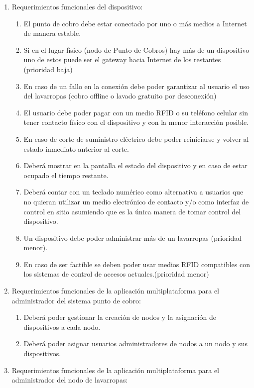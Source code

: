\documentclass[11pt]{charter}
\begin{document}
\begin{enumerate}
\item Requerimientos funcionales del dispositivo:
	\begin{enumerate}
\item El punto de cobro debe estar conectado por uno o más medios a  Internet de manera estable.
\item Si en el lugar físico (nodo de Punto de Cobros) hay más de un dispositivo uno de estos puede ser el gateway hacia Internet de los restantes (prioridad baja) 
\item En caso de un fallo en la conexión debe poder garantizar al usuario el uso del lavarropas (cobro offline o lavado gratuito por desconexión)
\item El usuario debe poder pagar con un medio RFID o su teléfono celular sin tener contacto físico con el dispositivo y con la menor interacción posible.
\item En caso de corte de suministro eléctrico debe poder reiniciarse y volver al estado inmediato anterior al corte.
\item Deberá mostrar en la pantalla el estado del dispositivo y en caso de estar ocupado el tiempo restante.
\item Deberá contar con un teclado numérico como alternativa a usuarios que no quieran utilizar un medio electrónico de contacto y/o como interfaz de control en sitio asumiendo que es la única manera de tomar control del dispositivo.
\item Un dispositivo debe poder administrar más de un lavarropas (prioridad menor).
\item En caso de ser factible se deben poder usar medios RFID compatibles con los sistemas de control de accesos actuales.(prioridad menor)
\end{enumerate}
\item Requerimientos funcionales de la aplicación multiplataforma para el administrador del sistema punto de cobro:
	\begin{enumerate} 
\item Deberá poder gestionar la creación de nodos y la asignación de dispositivos a cada nodo. 
\item Deberá poder asignar usuarios administradores de nodos a un nodo y sus dispositivos.
	\end{enumerate}
\item Requerimientos funcionales de la aplicación multiplataforma para el administrador del nodo de lavarropas:
	\begin{enumerate} 

\end{enumerate}
\end{enumerate}
\end{document}
